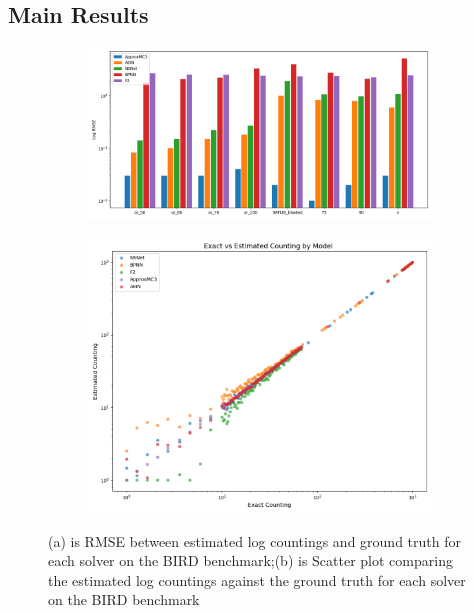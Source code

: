 \subsection{Main Results}
\begin{figure}[htbp]
    \centering
    \begin{subfigure}{0.48\textwidth}
        \centering
        \includegraphics[width=\linewidth]{png/柱状图.png} %
        \caption{}
        \label{fig:sub1}
    \end{subfigure}
    \hfill %
    \begin{subfigure}{0.48\textwidth}
        \centering
        \includegraphics[width=\linewidth]{png/plot.png} %
        \caption{}
        \label{fig:sub2}
    \end{subfigure}
    \caption{(a) is RMSE between estimated log countings and ground truth for each solver on the BIRD benchmark;(b) is Scatter plot comparing the estimated log countings against the ground truth for each solver on the BIRD benchmark}
    \label{fig:total}
\end{figure}

